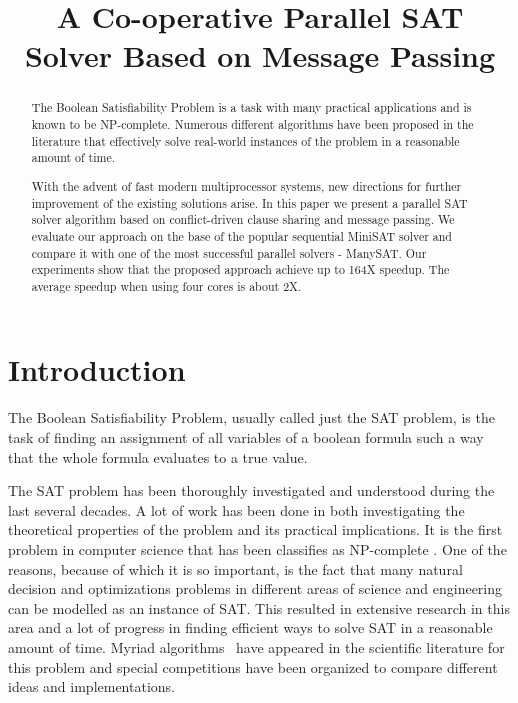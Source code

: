 \documentclass[letterpaper, compsoc, conference]{IEEEtran}
\begin{document}
\title{A Co-operative Parallel SAT Solver Based on Message Passing}

\author{
    \and {}
}
\maketitle

\begin{abstract}
The Boolean Satisfiability Problem is a task with many practical applications
and is known to be NP-complete. Numerous different algorithms have been
proposed in the literature that effectively solve real-world instances of the
problem in a reasonable amount of time. 

With the advent of fast modern multiprocessor systems, new directions for
further improvement of the existing solutions arise. In this paper we present a
parallel SAT solver algorithm based on conflict-driven clause sharing and
message passing. We evaluate our approach on the base of the popular sequential
MiniSAT solver and compare it with one of the most successful parallel solvers
- ManySAT. Our experiments show that the proposed approach achieve up to 164X
speedup. The average speedup when using four cores is about 2X.

\end{abstract}

\section{Introduction}

The Boolean Satisfiability Problem, usually called just the SAT problem, is the
task of finding an assignment of all variables of a boolean formula such a way
that the whole formula evaluates to a true value.

The SAT problem has been thoroughly investigated and understood during the last
several decades. A lot of work has been done in both investigating the
theoretical properties of the problem and its practical implications. It is the
first problem in computer science that has been classifies as NP-complete
\cite{SATNP}. One of the reasons, because of which it is so important, is the
fact that many natural decision and optimizations problems in different areas
of science and engineering can be modelled as an instance of SAT. This resulted
in extensive research in this area and a lot of progress in finding efficient
ways to solve SAT in a reasonable amount of time. Myriad
algorithms~\cite{CHAFF, GRASP, MiniSat,PSATO,WalkSAT,DPLL,GRADSAT,ManySAT} have
appeared in the scientific literature for this problem and special competitions
\cite{SATRace2008} have been organized to compare different ideas and
implementations.  \cite{GRASP}
\end{document}
